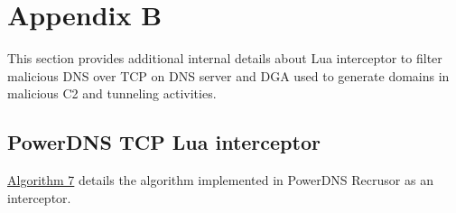 \documentclass [11pt, proquest] {uwthesis}[2020/02/24]
\begin{document}

\section{Appendix B}
This section provides additional internal details about Lua interceptor to filter malicious DNS over TCP on DNS server and DGA used to generate domains in malicious C2 and tunneling activities.



\subsection{PowerDNS TCP Lua interceptor}
\hyperref[sec:alg7]{Algorithm 7} details the algorithm implemented in PowerDNS Recrusor as an interceptor.
\end{document}
